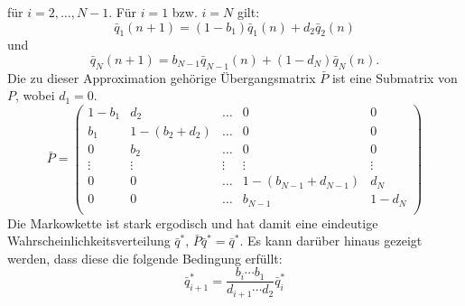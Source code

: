 \documentclass{article}
\begin{document}
für $i = 2,\dots, N-1$. Für $i = 1$ bzw{.} $i = N$ gilt:
\[
  \bar{q}_1(n+1) = (1 - b_1)\bar{q}_1(n) + d_2\bar{q}_2(n)
\]
und
\[
  \bar{q}_N(n+1) = b_{N-1}\bar{q}_{N-1}(n) + (1-d_N)\bar{q}_N(n).
\]
Die zu dieser Approximation gehörige Übergangsmatrix $\bar{P}$ ist eine Submatrix von $P$, wobei $d_1 = 0$.
\[
  \bar{P} = \begin{pmatrix}
    1-b_1 & d_2 & \dots & 0 & 0 \\
    b_1 & 1 - (b_2 + d_2) &  \dots & 0 & 0 \\
    0 & b_2 & \dots & 0 & 0 \\
    \vdots & \vdots & \vdots & \vdots & \vdots \\
    0 & 0  &  \dots & 1 - (b_{N-1} + d_{N-1}) & d_N \\
    0 & 0  &  \dots & b_{N-1} & 1 - d_N \\
  \end{pmatrix}
\]
Die Markowkette ist stark ergodisch und hat damit eine eindeutige Wahrscheinlichkeitsverteilung $\bar{q}^*$, $\bar{P}\bar{q}^* = \bar{q}^*$.
Es kann darüber hinaus gezeigt werden, dass diese die folgende Bedingung erfüllt:
\[
  \bar{q}^*_{i+1} = \frac{b_i \cdots b_1}{d_{i+1}\cdots d_2}\bar{q}^*_{i}
\]



\end{document}

